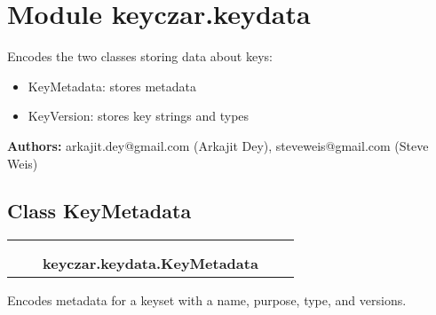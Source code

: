 %
%
%


\section{Module keyczar.keydata}

    \label{keyczar:keydata}
Encodes the two classes storing data about keys:

\begin{itemize}
\setlength{\parskip}{0.6ex}
  \item KeyMetadata: stores metadata

  \item KeyVersion: stores key strings and types

\end{itemize}

\textbf{Authors:}
arkajit.dey@gmail.com (Arkajit Dey),
    steveweis@gmail.com (Steve Weis)



\subsection{Class KeyMetadata}

    \label{keyczar:keydata:KeyMetadata}
\begin{tabular}{cccccc}
\multicolumn{2}{r}{\settowidth{\BCL}{object}\multirow{2}{\BCL}{object}}
&&
  \\\cline{3-3}
  &&\multicolumn{1}{c|}{}
&&
  \\
&&\multicolumn{2}{l}{\textbf{keyczar.keydata.KeyMetadata}}
\end{tabular}

Encodes metadata for a keyset with a name, purpose, type, and versions.


